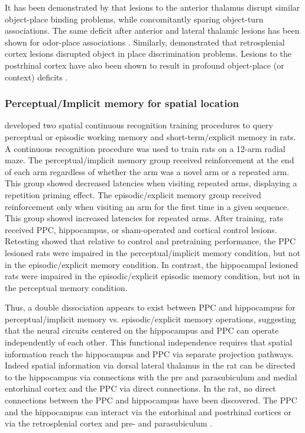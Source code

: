 \documentclass[doc, longtable]{apa6}
\begin{document}
It has been demonstrated by \textcite{Sziklas1999} that lesions to the anterior thalamus disrupt similar object-place binding problems, while concomitantly sparing object-turn associations. The same deficit after anterior and lateral thalamic lesions has been shown for odor-place associations \parencite{Gibb2006a}. Similarly, \textcite{Vann2002a} demonstrated that retrosplenial cortex lesions disrupted object in place discrimination problems. Lesions to the postrhinal cortex have also been shown to result in profound object-place (or context) deficits \parencite{Norman2004a}.

\subsubsection{Perceptual/Implicit memory for spatial location}
\textcite{Chiba2002b} developed two spatial continuous recognition training procedures to query perceptual or episodic working memory and short-term/explicit memory in rats. A continuous recognition procedure was used to train rats on a 12-arm radial maze. The perceptual/implicit memory group received reinforcement at the end of each arm regardless of whether the arm was a novel arm or a repeated arm. This group showed decreased latencies when visiting repeated arms, displaying a repetition priming effect. The episodic/explicit memory group received reinforcement only when visiting an arm for the first time in a given sequence. This group showed increased latencies for repeated arms. After training, rats received PPC, hippocampus, or sham-operated and cortical control lesions. Retesting showed that relative to control and pretraining performance, the PPC lesioned rats were impaired in the perceptual/implicit memory condition, but not in the episodic/explicit memory condition. In contrast, the hippocampal lesioned rats were impaired in the episodic/explicit episodic memory condition, but not in the perceptual memory condition.
 	
Thus, a double dissociation appears to exist between PPC and hippocampus for perceptual/implicit memory vs. episodic/explicit memory operations, suggesting that the neural circuits centered on the hippocampus and PPC can operate independently of each other. This functional independence requires that spatial information reach the hippocampus and PPC via separate projection pathways. Indeed spatial information via dorsal lateral thalamus in the rat can be directed to the hippocampus via connections with the pre and parasubiculum and medial entorhinal cortex and the PPC via direct connections. In the rat, no direct connections between the PPC and hippocampus have been discovered. The PPC and the hippocampus can interact via the entorhinal and postrhinal cortices or via the retrosplenial cortex and pre- and parasubiculum \parencite{Kohler1985b, vanGroen1990b, Witter2000a}. 
	
\end{document}
